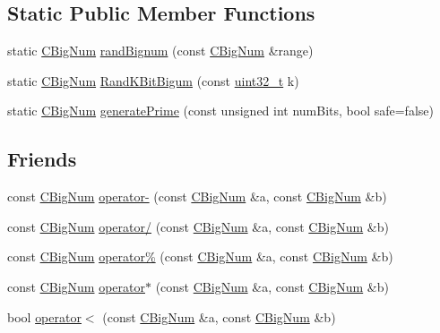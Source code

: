\subsection*{Static Public Member Functions}
\begin{DoxyCompactItemize}
\item 
static \hyperlink{class_c_big_num}{C\+Big\+Num} \hyperlink{class_c_big_num_a83e20522f042dd2b738bd26e21605e3b}{rand\+Bignum} (const \hyperlink{class_c_big_num}{C\+Big\+Num} \&range)
\item 
static \hyperlink{class_c_big_num}{C\+Big\+Num} \hyperlink{class_c_big_num_a200174f8261baebceb64b24a2d91f33f}{Rand\+K\+Bit\+Bigum} (const \hyperlink{stdint_8h_a435d1572bf3f880d55459d9805097f62}{uint32\+\_\+t} k)
\item 
static \hyperlink{class_c_big_num}{C\+Big\+Num} \hyperlink{class_c_big_num_a4579e2136563a20844d60d9fe513e1fe}{generate\+Prime} (const unsigned int num\+Bits, bool safe=false)
\end{DoxyCompactItemize}
\subsection*{Friends}
\begin{DoxyCompactItemize}
\item 
const \hyperlink{class_c_big_num}{C\+Big\+Num} \hyperlink{class_c_big_num_aeb0210adda76affb66975146b1168f71}{operator-\/} (const \hyperlink{class_c_big_num}{C\+Big\+Num} \&a, const \hyperlink{class_c_big_num}{C\+Big\+Num} \&b)
\item 
const \hyperlink{class_c_big_num}{C\+Big\+Num} \hyperlink{class_c_big_num_ac5a9fb08b1522f0cbcc30f87bac72f4b}{operator/} (const \hyperlink{class_c_big_num}{C\+Big\+Num} \&a, const \hyperlink{class_c_big_num}{C\+Big\+Num} \&b)
\item 
const \hyperlink{class_c_big_num}{C\+Big\+Num} \hyperlink{class_c_big_num_a8abffdb8b9ce531fef9fc3067d7329ef}{operator\%} (const \hyperlink{class_c_big_num}{C\+Big\+Num} \&a, const \hyperlink{class_c_big_num}{C\+Big\+Num} \&b)
\item 
const \hyperlink{class_c_big_num}{C\+Big\+Num} \hyperlink{class_c_big_num_a62e78c276de3957d599fd4974713fed2}{operator$\ast$} (const \hyperlink{class_c_big_num}{C\+Big\+Num} \&a, const \hyperlink{class_c_big_num}{C\+Big\+Num} \&b)
\item 
bool \hyperlink{class_c_big_num_a6db3085f36d565f1dd8589c8386d3a2f}{operator$<$} (const \hyperlink{class_c_big_num}{C\+Big\+Num} \&a, const \hyperlink{class_c_big_num}{C\+Big\+Num} \&b)
\end{DoxyCompactItemize}


